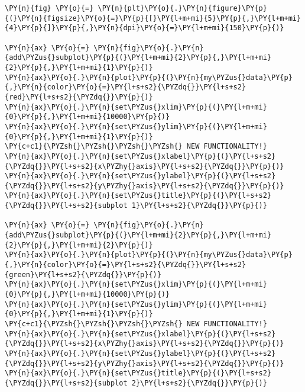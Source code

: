     \begin{tcolorbox}[breakable, size=fbox, boxrule=1pt, pad at break*=1mm,colback=cellbackground, colframe=cellborder]
\begin{Verbatim}[commandchars=\\\{\}]
\PY{n}{fig} \PY{o}{=} \PY{n}{plt}\PY{o}{.}\PY{n}{figure}\PY{p}{(}\PY{n}{figsize}\PY{o}{=}\PY{p}{[}\PY{l+m+mi}{5}\PY{p}{,}\PY{l+m+mi}{4}\PY{p}{]}\PY{p}{,}\PY{n}{dpi}\PY{o}{=}\PY{l+m+mi}{150}\PY{p}{)} 

\PY{n}{ax} \PY{o}{=} \PY{n}{fig}\PY{o}{.}\PY{n}{add\PYZus{}subplot}\PY{p}{(}\PY{l+m+mi}{2}\PY{p}{,}\PY{l+m+mi}{2}\PY{p}{,}\PY{l+m+mi}{1}\PY{p}{)}
\PY{n}{ax}\PY{o}{.}\PY{n}{plot}\PY{p}{(}\PY{n}{my\PYZus{}data}\PY{p}{,}\PY{n}{color}\PY{o}{=}\PY{l+s+s2}{\PYZdq{}}\PY{l+s+s2}{red}\PY{l+s+s2}{\PYZdq{}}\PY{p}{)}
\PY{n}{ax}\PY{o}{.}\PY{n}{set\PYZus{}xlim}\PY{p}{(}\PY{l+m+mi}{0}\PY{p}{,}\PY{l+m+mi}{10000}\PY{p}{)}
\PY{n}{ax}\PY{o}{.}\PY{n}{set\PYZus{}ylim}\PY{p}{(}\PY{l+m+mi}{0}\PY{p}{,}\PY{l+m+mi}{1}\PY{p}{)}
\PY{c+c1}{\PYZsh{}\PYZsh{}\PYZsh{}\PYZsh{} NEW FUNCTIONALITY!}
\PY{n}{ax}\PY{o}{.}\PY{n}{set\PYZus{}xlabel}\PY{p}{(}\PY{l+s+s2}{\PYZdq{}}\PY{l+s+s2}{x\PYZhy{}axis}\PY{l+s+s2}{\PYZdq{}}\PY{p}{)}
\PY{n}{ax}\PY{o}{.}\PY{n}{set\PYZus{}ylabel}\PY{p}{(}\PY{l+s+s2}{\PYZdq{}}\PY{l+s+s2}{y\PYZhy{}axis}\PY{l+s+s2}{\PYZdq{}}\PY{p}{)}
\PY{n}{ax}\PY{o}{.}\PY{n}{set\PYZus{}title}\PY{p}{(}\PY{l+s+s2}{\PYZdq{}}\PY{l+s+s2}{subplot 1}\PY{l+s+s2}{\PYZdq{}}\PY{p}{)}

\PY{n}{ax} \PY{o}{=} \PY{n}{fig}\PY{o}{.}\PY{n}{add\PYZus{}subplot}\PY{p}{(}\PY{l+m+mi}{2}\PY{p}{,}\PY{l+m+mi}{2}\PY{p}{,}\PY{l+m+mi}{2}\PY{p}{)}
\PY{n}{ax}\PY{o}{.}\PY{n}{plot}\PY{p}{(}\PY{n}{my\PYZus{}data}\PY{p}{,}\PY{n}{color}\PY{o}{=}\PY{l+s+s2}{\PYZdq{}}\PY{l+s+s2}{green}\PY{l+s+s2}{\PYZdq{}}\PY{p}{)}
\PY{n}{ax}\PY{o}{.}\PY{n}{set\PYZus{}xlim}\PY{p}{(}\PY{l+m+mi}{0}\PY{p}{,}\PY{l+m+mi}{10000}\PY{p}{)}
\PY{n}{ax}\PY{o}{.}\PY{n}{set\PYZus{}ylim}\PY{p}{(}\PY{l+m+mi}{0}\PY{p}{,}\PY{l+m+mi}{1}\PY{p}{)}
\PY{c+c1}{\PYZsh{}\PYZsh{}\PYZsh{}\PYZsh{} NEW FUNCTIONALITY!}
\PY{n}{ax}\PY{o}{.}\PY{n}{set\PYZus{}xlabel}\PY{p}{(}\PY{l+s+s2}{\PYZdq{}}\PY{l+s+s2}{x\PYZhy{}axis}\PY{l+s+s2}{\PYZdq{}}\PY{p}{)}
\PY{n}{ax}\PY{o}{.}\PY{n}{set\PYZus{}ylabel}\PY{p}{(}\PY{l+s+s2}{\PYZdq{}}\PY{l+s+s2}{y\PYZhy{}axis}\PY{l+s+s2}{\PYZdq{}}\PY{p}{)}
\PY{n}{ax}\PY{o}{.}\PY{n}{set\PYZus{}title}\PY{p}{(}\PY{l+s+s2}{\PYZdq{}}\PY{l+s+s2}{subplot 2}\PY{l+s+s2}{\PYZdq{}}\PY{p}{)}


\end{Verbatim}
\end{tcolorbox}
